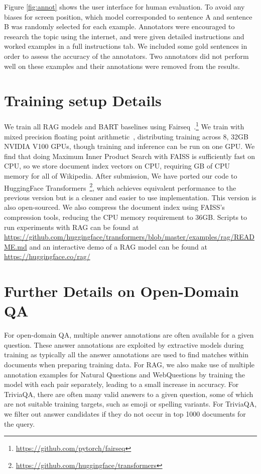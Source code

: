 \documentclass{article}
\begin{document}
Figure \ref{fig:annot} shows the user interface for human evaluation. To avoid any biases for screen position, which model corresponded to sentence A and sentence B was randomly selected for each example. Annotators were encouraged to research the topic using the internet, and were given detailed instructions and worked examples in a full instructions tab. We included some gold sentences in order to assess the accuracy of the annotators. Two annotators did not perform well on these examples and their annotations were removed from the results.

\section{Training setup Details}
We train all RAG models and BART baselines using Fairseq~\cite{ott-etal-2019-fairseq}.\footnote{\url{https://github.com/pytorch/fairseq}}
We train with mixed precision floating point arithmetic~\cite{micikevicius2018mixed}, distributing training across 8, 32GB NVIDIA V100 GPUs, though training and inference can be run on one GPU.
We find that doing Maximum Inner Product Search with FAISS is sufficiently fast on CPU, so we store document index vectors on CPU, requiring  GB of CPU memory for all of Wikipedia.
After submission, We have ported our code to HuggingFace Transformers~\cite{Wolf2019HuggingFacesTS}\footnote{\url{https://github.com/huggingface/transformers}}, which achieves equivalent performance to the previous version but is a cleaner and easier to use implementation. This version is also open-sourced. We also compress the document index using FAISS's compression tools, reducing the CPU memory requirement to 36GB. Scripts to run experiments with RAG can be found at \url{https://github.com/huggingface/transformers/blob/master/examples/rag/README.md} and an interactive demo of a RAG model can be found at \url{https://huggingface.co/rag/}

\section{Further Details on Open-Domain QA}
\label{sec:qa_appendix}
For open-domain QA, multiple answer annotations are often available for a given question. These answer annotations are exploited by extractive models during training as typically all the answer annotations are used to find matches within documents when preparing training data. For RAG, we also make use of multiple annotation examples for Natural Questions and WebQuestions by training the model with each  pair separately, leading to a small increase in accuracy. For TriviaQA, there are often many valid answers to a given question, some of which are not suitable training targets, such as emoji or spelling variants. For TriviaQA, we filter out answer candidates if they do not occur in top 1000 documents for the query.
\end{document}
